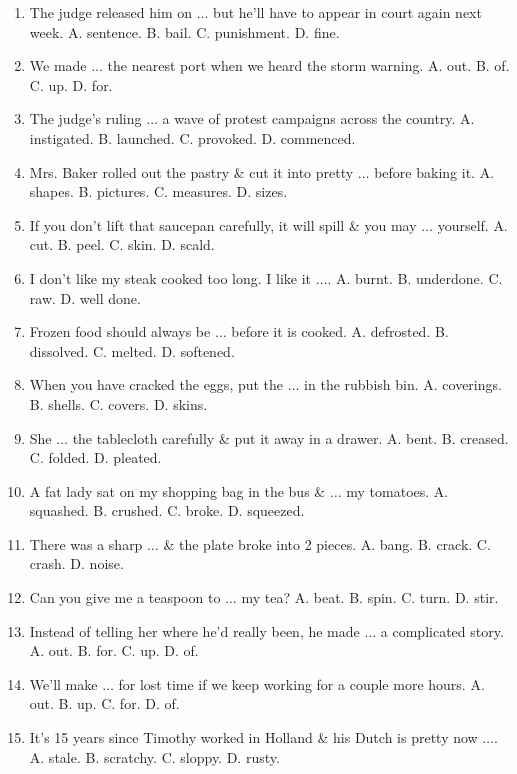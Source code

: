 \documentclass{article}
\numberwithin{equation}{section}
\begin{document}
\begin{enumerate}[leftmargin=8mm]
	\item The judge released him on $\ldots$ but he'll have to appear in court again next week. {\sf A.} sentence. {\sf B.} bail. {\sf C.} punishment. {\sf D.} fine.
	\item We made $\ldots$ the nearest port when we heard the storm warning. {\sf A.} out. {\sf B.} of. {\sf C.} up. {\sf D.} for.
	\item The judge's ruling $\ldots$ a wave of protest campaigns across the country. {\sf A.} instigated. {\sf B.} launched. {\sf C.} provoked. {\sf D.} commenced.
	\item Mrs. Baker rolled out the pastry \& cut it into pretty $\ldots$ before baking it. {\sf A.} shapes. {\sf B.} pictures. {\sf C.} measures. {\sf D.} sizes.
	\item If you don't lift that saucepan carefully, it will spill \& you may $\ldots$ yourself. {\sf A.} cut. {\sf B.} peel. {\sf C.} skin. {\sf D.} scald.
	\item I don't like my steak cooked too long. I like it $\ldots$. {\sf A.} burnt. {\sf B.} underdone. {\sf C.} raw. {\sf D.} well done.
	\item Frozen food should always be $\ldots$ before it is cooked. {\sf A.} defrosted. {\sf B.} dissolved. {\sf C.} melted. {\sf D.} softened.
	\item When you have cracked the eggs, put the $\ldots$ in the rubbish bin. {\sf A.} coverings. {\sf B.} shells. {\sf C.} covers. {\sf D.} skins.
	\item She $\ldots$ the tablecloth carefully \& put it away in a drawer. {\sf A.} bent. {\sf B.} creased. {\sf C.} folded. {\sf D.} pleated.
	\item A fat lady sat on my shopping bag in the bus \& $\ldots$ my tomatoes. {\sf A.} squashed. {\sf B.} crushed. {\sf C.} broke. {\sf D.} squeezed.
	\item There was a sharp $\ldots$ \& the plate broke into 2 pieces. {\sf A.} bang. {\sf B.} crack. {\sf C.} crash. {\sf D.} noise.
	\item Can you give me a teaspoon to $\ldots$ my tea? {\sf A.} beat. {\sf B.} spin. {\sf C.} turn. {\sf D.} stir.
	\item Instead of telling her where he'd really been, he made $\ldots$ a complicated story. {\sf A.} out. {\sf B.} for. {\sf C.} up. {\sf D.} of.
	\item We'll make $\ldots$ for lost time if we keep working for a couple more hours. {\sf A.} out. {\sf B.} up. {\sf C.} for. {\sf D.} of.
	\item It's 15 years since Timothy worked in Holland \& his Dutch is pretty now $\ldots$. {\sf A.} stale. {\sf B.} scratchy. {\sf C.} sloppy. {\sf D.} rusty.

\end{enumerate}
\end{document}
